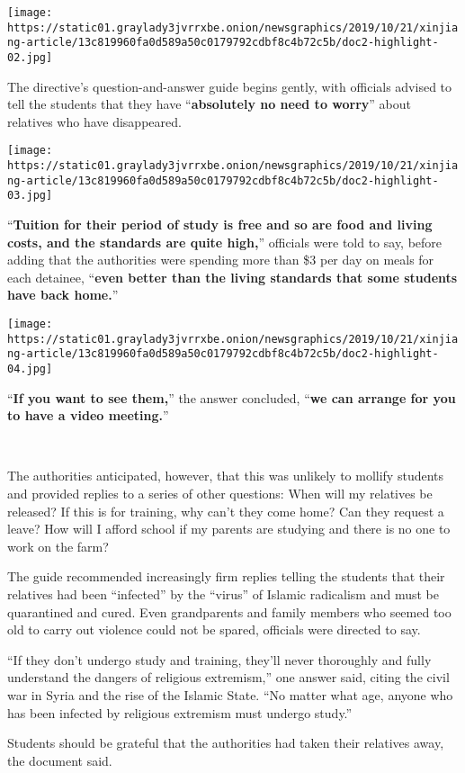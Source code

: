 \texttt{[image: https://static01.graylady3jvrrxbe.onion/newsgraphics/2019/10/21/xinjiang-article/13c819960fa0d589a50c0179792cdbf8c4b72c5b/doc2-highlight-02.jpg]}

The directive's question-and-answer guide begins gently, with officials
advised to tell the students that they have ``\textbf{absolutely no need
to worry}'' about relatives who have disappeared.

\texttt{[image: https://static01.graylady3jvrrxbe.onion/newsgraphics/2019/10/21/xinjiang-article/13c819960fa0d589a50c0179792cdbf8c4b72c5b/doc2-highlight-03.jpg]}

``\textbf{Tuition for their period of study is free and so are food and
living costs, and the standards are quite high,}'' officials were told
to say, before adding that the authorities were spending more than \$3
per day on meals for each detainee, ``\textbf{even better than the
living standards that some students have back home.}''

\texttt{[image: https://static01.graylady3jvrrxbe.onion/newsgraphics/2019/10/21/xinjiang-article/13c819960fa0d589a50c0179792cdbf8c4b72c5b/doc2-highlight-04.jpg]}

``\textbf{If you want to see them,}'' the answer concluded, ``\textbf{we
can arrange for you to have a video meeting.}''

​

The authorities anticipated, however, that this was unlikely to mollify
students and provided replies to a series of other questions: When will
my relatives be released? If this is for training, why can't they come
home? Can they request a leave? How will I afford school if my parents
are studying and there is no one to work on the farm?

The guide recommended increasingly firm replies telling the students
that their relatives had been ``infected'' by the ``virus'' of Islamic
radicalism and must be quarantined and cured. Even grandparents and
family members who seemed too old to carry out violence could not be
spared, officials were directed to say.

``If they don't undergo study and training, they'll never thoroughly and
fully understand the dangers of religious extremism,'' one answer said,
citing the civil war in Syria and the rise of the Islamic State. ``No
matter what age, anyone who has been infected by religious extremism
must undergo study.''

Students should be grateful that the authorities had taken their
relatives away, the document said.

